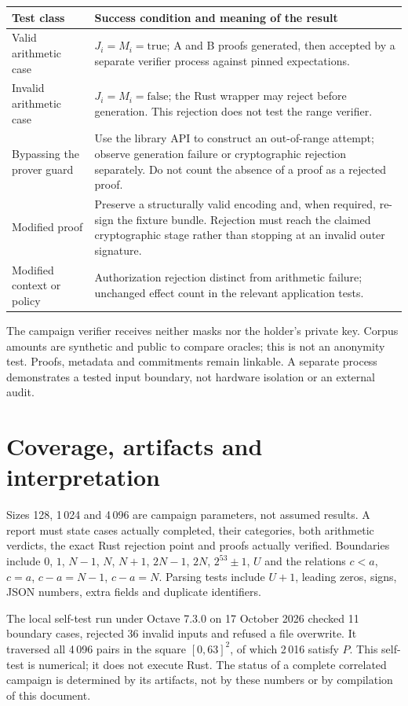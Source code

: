 \documentclass[11pt,a4paper]{article}
\begin{document}
\begin{center}\small
\begin{tabular}{p{.24\linewidth}p{.66\linewidth}}
\toprule
Test class & Success condition and meaning of the result \\
\midrule
Valid arithmetic case & $J_i=M_i=\mathrm{true}$; A and B proofs generated,
 then accepted by a separate verifier process against pinned expectations. \\
Invalid arithmetic case & $J_i=M_i=\mathrm{false}$; the Rust wrapper may
 reject before generation. This rejection does not test the range verifier. \\
Bypassing the prover guard & Use the library API to construct an out-of-range
 attempt; observe generation failure or cryptographic rejection separately.
 Do not count the absence of a proof as a rejected proof. \\
Modified proof & Preserve a structurally valid encoding and, when required,
 re-sign the fixture bundle. Rejection must reach the claimed cryptographic
 stage rather than stopping at an invalid outer signature. \\
Modified context or policy & Authorization rejection distinct from arithmetic
 failure; unchanged effect count in the relevant application tests. \\
\bottomrule
\end{tabular}
\end{center}

The campaign verifier receives neither masks nor the holder's private key.
Corpus amounts are synthetic and public to compare oracles; this is not
an anonymity test. Proofs, metadata and commitments remain linkable.
A separate process demonstrates a tested input boundary, not hardware
isolation or an external audit.

\section{Coverage, artifacts and interpretation}
Sizes 128, 1\,024 and 4\,096 are campaign parameters, not assumed results.
A report must state cases actually completed, their categories, both
arithmetic verdicts, the exact Rust rejection point and proofs actually
verified. Boundaries include
$0$, $1$, $N-1$, $N$, $N+1$, $2N-1$, $2N$, $2^{53}\pm1$, $U$ and the
relations $c<a$, $c=a$, $c-a=N-1$, $c-a=N$. Parsing tests include
$U+1$, leading zeros, signs, JSON numbers, extra fields and duplicate
identifiers.

The local self-test run under Octave 7.3.0 on 17 October 2026 checked
11 boundary cases, rejected 36 invalid inputs and refused a file overwrite.
It traversed all 4\,096 pairs in the square $[0,63]^2$, of which
2\,016 satisfy $P$. This self-test is numerical; it does not execute Rust.
The status of a complete correlated campaign is determined by its artifacts,
not by these numbers or by compilation of this document.
\end{document}
